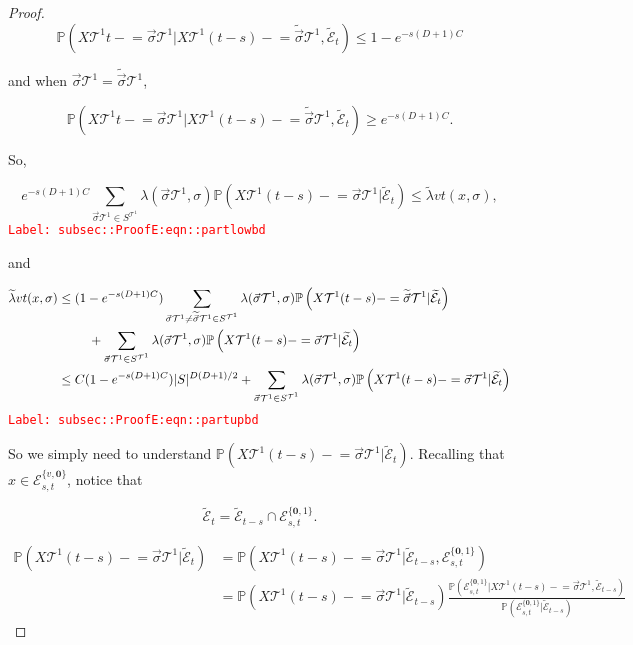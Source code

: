 \documentclass[12pt]{article}
\newcommand{\mb}{\mathbb}
\newcommand{\mc}{\mathcal}
\newcommand{\tr}{\textcolor{red}}
\newcommand{\labe}[1]{\tr{\texttt{Label: #1}}}
\newcommand{\pr}{\mb{P}}							%
\renewcommand{\root}{\mathbf{0}}				%
\renewcommand{\v}{v}							%
\renewcommand{\S}{S}							%
\newcommand{\s}{\sigma}							%
\newcommand{\sv}{\vec{\s}}						%
\newcommand{\x}{x}								%
\renewcommand{\t}{t}							%
\renewcommand{\tt}{s}							%
\newcommand{\X}{X}								%
\newcommand{\const}{C}							%
\newcommand{\degr}{D}							%
\newcommand{\tree}{\mc{T}}						%
\newcommand{\sln}[1]{^{#1}}						%
\newcommand{\rate}{\lambda}						%
\newcommand{\alt}[1]{\widetilde{#1}}			%
\newcommand{\evnt}{\mc{E}}						%
\newcommand{\crate}{\alt{\lambda}}				%
\begin{document}
\begin{proof}
\[\pr\left(\X{\tree\sln{1}}{\t-} = \sv{}{\tree\sln{1}}|\X{\tree\sln{1}}{(\t-\tt)-}=\alt{\sv}{}{\tree\sln{1}},\alt{\evnt}_\t\right) \leq 1-e^{-\tt(\degr+1)\const{}}\]

and when \(\sv{}{\tree\sln{1}}=\alt{\sv}{}{\tree\sln{1}}\),

\[\pr\left(\X{\tree\sln{1}}{\t-} = \sv{}{\tree\sln{1}}|\X{\tree\sln{1}}{(\t-\tt)-}=\alt{\sv}{}{\tree\sln{1}},\alt{\evnt}_\t\right) \geq e^{-\tt(\degr+1)\const{}}.\]

So,

\begin{equation}
e^{-\tt(\degr+1)\const{}}\sum_{\sv{}{\tree\sln{1}}\in \S^{\tree\sln{1}}} \rate{}(\sv{}{\tree\sln{1}},\s)\pr\left(\X{\tree\sln{1}}{(\t-\tt)-}=\sv{}{\tree\sln{1}}|\alt{\evnt}_\t\right) \leq \crate{\v}{\t}(\x{}{},\s),
\label{subsec::ProofE:eqn::partlowbd}
\end{equation}
\labe{subsec::ProofE:eqn::partlowbd}

and

\begin{align}
\crate{\v}{\t}(\x{}{},\s)&\leq (1 - e^{-\tt(\degr+1)\const{}})\sum_{\sv{}{\tree\sln{1}}\neq \alt{\sv}{}{\tree\sln{1}} \in \S^{\tree\sln{1}}} \rate{}(\sv{}{\tree\sln{1}},\s)\pr\left(\X{\tree\sln{1}}{(\t-\tt)-}=\alt{\sv}{}{\tree\sln{1}}|\alt{\evnt}_\t\right)\nonumber\\
&\hspace{24 pt} +\sum_{\sv{}{\tree\sln{1}} \in \S^{\tree\sln{1}}} \rate{}(\sv{}{\tree\sln{1}},\s)\pr\left(\X{\tree\sln{1}}{(\t-\tt)-}=\sv{}{\tree\sln{1}}|\alt{\evnt}_\t\right)\nonumber\\
&\leq \const{}(1 - e^{-\tt(\degr+1)\const{}})|\S|^{\degr(\degr+1)/2} + \sum_{\sv{}{\tree\sln{1}} \in \S^{\tree\sln{1}}} \rate{}(\sv{}{\tree\sln{1}},\s)\pr\left(\X{\tree\sln{1}}{(\t-\tt)-}=\sv{}{\tree\sln{1}}|\alt{\evnt}_\t\right)
\label{subsec::ProofE:eqn::partupbd}
\end{align}
\labe{subsec::ProofE:eqn::partupbd}

So we simply need to understand \(\pr\left(\X{\tree\sln{1}}{(\t-\tt)-}=\sv{}{\tree\sln{1}}|\alt{\evnt}_\t\right)\). Recalling that \(\x{}{} \in \evnt^{\{\v,\root\}}_{\tt,\t}\), notice that

\[\alt{\evnt}_\t = \alt{\evnt}_{\t-\tt}\cap \evnt^{\{\root,1\}}_{\tt,\t}.\]

\begin{align*}
\pr\left(\X{\tree\sln{1}}{(\t-\tt)-}=\sv{}{\tree\sln{1}}|\alt{\evnt}_\t\right) &= \pr\left(\X{\tree\sln{1}}{(\t-\tt)-}=\sv{}{\tree\sln{1}}|\alt{\evnt}_{\t-\tt},\evnt^{\{\root,1\}}_{\tt,\t}\right)\\
&=\pr\left(\X{\tree\sln{1}}{(\t-\tt)-}=\sv{}{\tree\sln{1}}|\alt{\evnt}_{\t-\tt}\right)\frac{\pr\left(\evnt^{\{\root,1\}}_{\tt,\t}|\X{\tree\sln{1}}{(\t-\tt)-}=\sv{}{\tree\sln{1}},\alt{\evnt}_{\t-\tt}\right)}{\pr\left(\evnt^{\{\root,1\}}_{\tt,\t}|\alt{\evnt}_{\t-\tt}\right)}
\end{align*}


\end{proof}
\end{document}
